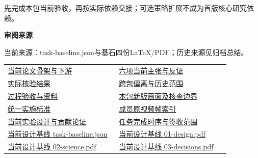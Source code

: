 \documentclass[11pt,a4paper]{article}
\newcommand{\reviewsubsection}[1]{\par\Needspace{4\baselineskip}\vspace{4pt}\begin{center}{\titlelatin\titlecjk\bfseries\fontsize{12}{18}\selectfont #1}\end{center}}
\begin{document}
先完成本包当前验收，再按实际依赖交接；可选策略扩展不成为首版核心研究依赖。


\begin{minipage}{\linewidth}
\reviewsubsection{3.4 审阅来源}
当前来源：task-\allowbreak{}baseline.json与基石四份LaTeX/\allowbreak{}PDF；历史来源见归档总结。


\begingroup\small\setlength{\tabcolsep}{4pt}\begin{tabular}{@{}p{0.48\linewidth}p{0.48\linewidth}@{}}
\href{file:///D:/Agent/srp/agent/tasks/W-01/outputs/current-paper.md}{当前论文骨架与下游} & \href{file:///D:/Agent/srp/agent/tasks/W-01/outputs/current-paper.json}{六项当前主张与反证}\\[4pt]
\href{file:///D:/Agent/srp/agent/tasks/W-01/evidence/verification.json}{实际核验结果} & \href{file:///D:/Agent/srp/agent/tasks/W-01/evidence/consumer-impact.md}{跨包偏离与历史范围}\\[4pt]
\href{file:///D:/Agent/srp/agent/tasks/W-01/TASK.md}{过程验收与资料} & \href{file:///D:/Agent/srp/agent/tasks/W-01/outputs/current-implementation-evidence.md}{本包新版画面及核查边界}\\[4pt]
\href{file:///D:/Agent/srp/agent/design/weather/2026-10-08_Storm\%E4\%B8\%8E\%E7\%BA\%AF\%E7\%B2\%92\%E5\%AD\%90\%E5\%8F\%8C\%E7\%8E\%AF\%E5\%AE\%9E\%E6\%96\%BD\%E6\%A0\%87\%E5\%87\%86.md}{统一实施标准} & \href{file:///D:/Agent/srp/human/assets/previews/2026-10-08/member-storm-particle-rings/frame-index.json}{成员原视频帧索引}\\[4pt]
\href{file:///D:/Agent/srp/agent/design/\%E5\%8E\%9F\%E5\%88\%9B\%E6\%80\%A7\%E4\%B8\%8E\%E8\%B4\%A1\%E7\%8C\%AE\%E8\%AE\%BA\%E8\%AF\%81_\%E5\%BD\%93\%E5\%89\%8D.md}{当前实验设计与贡献论证} & \href{file:///D:/Agent/srp/agent/work/2026-10-08_\%E4\%BB\%BB\%E5\%8A\%A1\%E5\%AE\%8C\%E6\%88\%90\%E6\%97\%B6\%E5\%BA\%8F\%E4\%B8\%8E\%E7\%A0\%94\%E7\%A9\%B6\%E4\%B8\%BB\%E6\%97\%A8.md}{任务完成时序与签收范围}\\[4pt]
\href{file:///D:/Agent/srp/agent/design/design-foundation-20261008/task-baseline.json}{当前设计基线 task-\allowbreak{}baseline.json} & \href{file:///D:/Agent/srp/agent/design/design-foundation-20261008/01-design.pdf}{当前设计基线 01-\allowbreak{}design.pdf}\\[4pt]
\href{file:///D:/Agent/srp/agent/design/design-foundation-20261008/02-science.pdf}{当前设计基线 02-\allowbreak{}science.pdf} & \href{file:///D:/Agent/srp/agent/design/design-foundation-20261008/03-decisions.pdf}{当前设计基线 03-\allowbreak{}decisions.pdf}\\[4pt]

\end{tabular}
\end{minipage}
\end{document}
